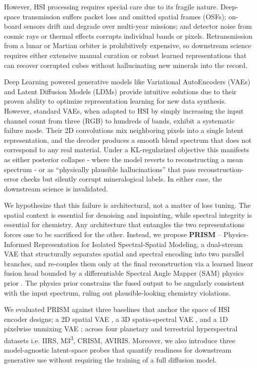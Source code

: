 \documentclass{article} %
\begin{document}
However, HSI processing requires special care due to its fragile nature. Deep-space transmission suffers packet loss and omitted spatial frames (OSFs); on-board sensors drift and degrade over multi-year missions; and detector noise from cosmic rays or thermal effects corrupts individual bands or pixels. Retransmission from a lunar or Martian orbiter is prohibitively expensive, so downstream science requires either extensive manual curation or robust learned representations that can recover corrupted cubes without hallucinating new minerals into the record.

Deep Learning powered generative models like Variational AutoEncoders (VAEs) \citep{kingma2014vae} and Latent Diffusion Models (LDMs) \citep{rombach2022ldm} provide intuitive solutions due to their proven ability to optimize representation learning for new data synthesis. However, standard VAEs, when adapted to HSI by simply increasing the input channel count from three (RGB) to hundreds of bands, exhibit a systematic failure mode. Their 2D convolutions mix neighboring pixels into a single latent representation, and the decoder produces a smooth blend spectrum that does not correspond to any real material. Under a KL-regularized objective this manifests as either posterior collapse - where the model reverts to reconstructing a mean spectrum - or as ``physically plausible hallucinations'' that pass reconstruction-error checks but silently corrupt mineralogical labels. In either case, the downstream science is invalidated.

We hypothesize that this failure is architectural, not a matter of loss tuning. The spatial context is essential for denoising and inpainting, while spectral integrity is essential for chemistry. Any architecture that entangles the two representations forces one to be sacrificed for the other. Instead, we propose \textbf{PRISM} -- Physics-Informed Representation for Isolated Spectral-Spatial Modeling, a dual-stream VAE that structurally separates spatial and spectral encoding into two parallel branches, and re-couples them only at the final reconstruction via a learned linear fusion head bounded by a differentiable Spectral Angle Mapper (SAM) physics prior \citep{kruse1993sips}. The physics prior constrains the fused output to be angularly consistent with the input spectrum, ruling out plausible-looking chemistry violations.

We evaluated PRISM against three baselines that anchor the space of HSI encoder designs; a 2D spatial VAE \citep{rombach2022ldm}, a 3D spatio-spectral VAE \citep{chen2016deep}, and a 1D pixelwise unmixing VAE \citep{su2019daen}; across four planetary and terrestrial hyperspectral datasets i.e. IIRS, M3\textsuperscript{3}, CRISM, AVIRIS. Moreover, we also introduce three model-agnostic latent-space probes that quantify readiness for downstream generative use without requiring the training of a full diffusion model.
\end{document}
